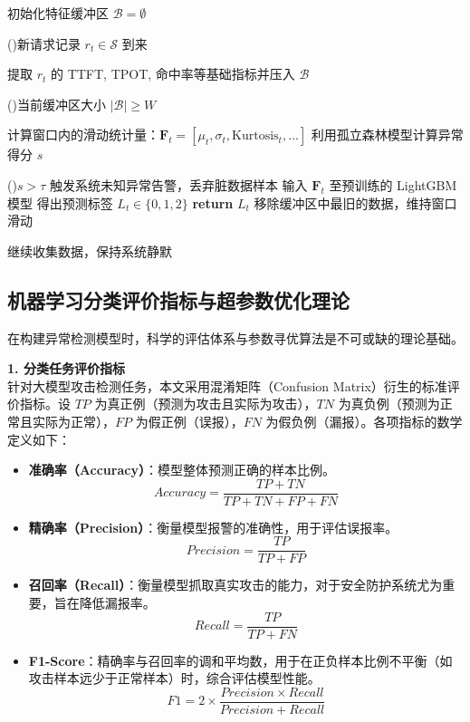 \documentclass[master, vlined]{DissertUESTC}
\begin{document}
	\begin{algorithm}[!h]
		\caption{基于滑动窗口的大模型推理异常检测算法} \label{alg: 特征提取与检测}
		初始化特征缓冲区 $\mathcal{B} = \emptyset$\;
		
		\For(){新请求记录 $r_t \in \mathcal{S}$ 到来}{
			提取 $r_t$ 的 TTFT, TPOT, 命中率等基础指标并压入 $\mathcal{B}$\;
			
			\eIf(){当前缓冲区大小 $|\mathcal{B}| \geq W$}{
				计算窗口内的滑动统计量：$\mathbf{F}_t = [\mu_{t}, \sigma_{t}, \text{Kurtosis}_{t}, \dots]$\;
				利用孤立森林模型计算异常得分 $s$\;
				
				\eIf(){$s > \tau$}{
					触发系统未知异常告警，丢弃脏数据样本\;
				}{
					输入 $\mathbf{F}_t$ 至预训练的 LightGBM 模型\;
					得出预测标签 $L_t \in \{0, 1, 2\}$\;
					\textbf{return} $L_t$\;
				}
				移除缓冲区中最旧的数据，维持窗口滑动\;
			}{
				继续收集数据，保持系统静默\;
			}
		}
	\end{algorithm}

	\subsection{机器学习分类评价指标与超参数优化理论}
	
	在构建异常检测模型时，科学的评估体系与参数寻优算法是不可或缺的理论基础。

	\textbf{1. 分类任务评价指标} \\
	针对大模型攻击检测任务，本文采用混淆矩阵（Confusion Matrix）衍生的标准评价指标。设 $TP$ 为真正例（预测为攻击且实际为攻击），$TN$ 为真负例（预测为正常且实际为正常），$FP$ 为假正例（误报），$FN$ 为假负例（漏报）。各项指标的数学定义如下：
	\begin{itemize}
		\item \textbf{准确率（Accuracy）}：模型整体预测正确的样本比例。
		\begin{equation}
			Accuracy = \frac{TP + TN}{TP + TN + FP + FN}
		\end{equation}
		\item \textbf{精确率（Precision）}：衡量模型报警的准确性，用于评估误报率。
		\begin{equation}
			Precision = \frac{TP}{TP + FP}
		\end{equation}
		\item \textbf{召回率（Recall）}：衡量模型抓取真实攻击的能力，对于安全防护系统尤为重要，旨在降低漏报率。
		\begin{equation}
			Recall = \frac{TP}{TP + FN}
		\end{equation}
		\item \textbf{F1-Score}：精确率与召回率的调和平均数，用于在正负样本比例不平衡（如攻击样本远少于正常样本）时，综合评估模型性能。
		\begin{equation}
			F1 = 2 \times \frac{Precision \times Recall}{Precision + Recall}
		\end{equation}
	\end{itemize}
\end{document}
